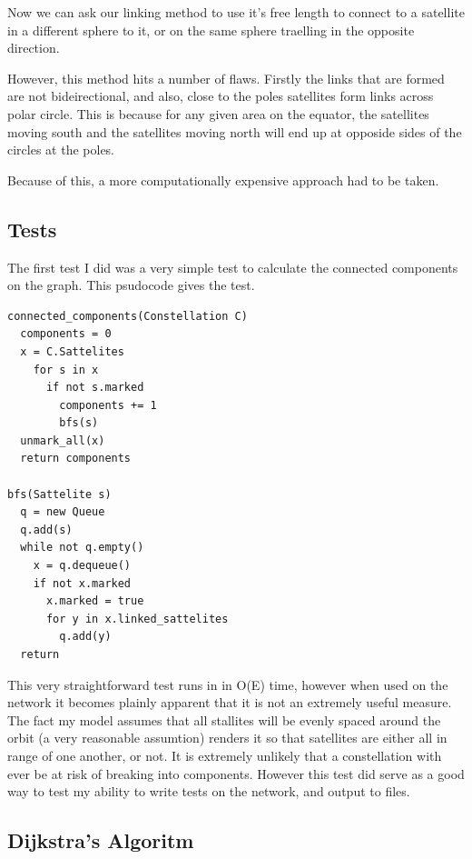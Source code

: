\documentclass[12pt]{article}
\begin{document}
Now we can ask our linking method to use it's free length to connect to a satellite in a different sphere to it, or on the same sphere traelling in the opposite direction.

However, this method hits a number of flaws. Firstly the links that are formed are not bideirectional, and also, close to the poles satellites form links across polar circle. This is because for any given area on the equator, the satellites moving south and the satellites moving north will end up at opposide sides of the circles at the poles.


Because of this, a more computationally expensive approach had to be taken.


\subsection{Tests}

The first test I did was a very simple test to calculate the connected components on the graph. This psudocode gives the test.

\begin{lstlisting}
connected_components(Constellation C)
  components = 0
  x = C.Sattelites
    for s in x
      if not s.marked
        components += 1
        bfs(s)
  unmark_all(x)
  return components

bfs(Sattelite s)
  q = new Queue
  q.add(s)
  while not q.empty()
    x = q.dequeue()
    if not x.marked
      x.marked = true
      for y in x.linked_sattelites
        q.add(y)
  return			
\end{lstlisting}

This very straightforward test runs in in O(E) time, however when used on the network it becomes plainly apparent that it is not an extremely useful measure. The fact my model assumes that all stallites will be evenly spaced around the orbit (a very reasonable assumtion) renders it so that satellites are either all in range of one another, or not. It is extremely unlikely that a constellation with ever be at risk of breaking into components. However this test did serve as a good way to test my ability to write tests on the network, and output to files.

\subsection{Dijkstra's Algoritm}
\end{document}
